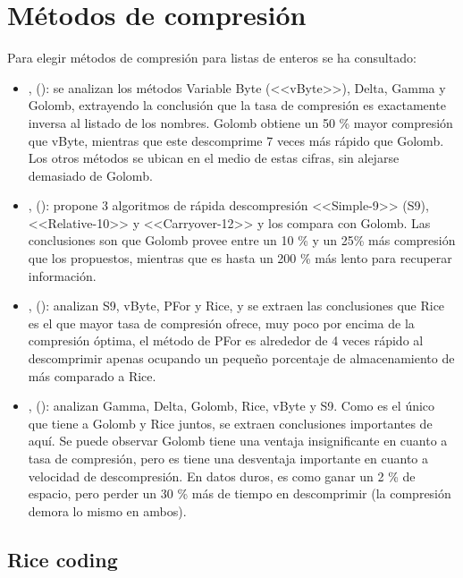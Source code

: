 \section{Métodos de compresión}

Para elegir métodos de compresión para listas de enteros se ha consultado:

\begin{itemize}

\item \citet{Trotman:2003}, (\citeyear{Trotman:2003}): se analizan los métodos Variable Byte (<<vByte>>), Delta, Gamma y Golomb, extrayendo la conclusión que la tasa de compresión es exactamente inversa al listado de los nombres. Golomb obtiene un 50 \% mayor compresión que vByte, mientras que este descomprime 7 veces más rápido que Golomb. Los otros métodos se ubican en el medio de estas cifras, sin alejarse demasiado de Golomb.

\item \citet{Anh:2005}, (\citeyear{Anh:2005}): propone 3 algoritmos de rápida descompresión <<Simple-9>> (S9), <<Relative-10>> y <<Carryover-12>> y los compara con Golomb. Las conclusiones son que Golomb provee entre un 10 \% y un 25\% más compresión que los propuestos, mientras que es hasta un 200 \% más lento para recuperar información.

\item \citet{Zhang:2008}, (\citeyear{Zhang:2008}): analizan S9, vByte, PFor y Rice, y se extraen las conclusiones que Rice es el que mayor tasa de compresión ofrece, muy poco por encima de la compresión óptima, el método de PFor es alrededor de 4 veces rápido al descomprimir apenas ocupando un pequeño porcentaje de almacenamiento de más comparado a Rice.

\item \citet[p.~210]{Buettcher2010}, (\citeyear{Buettcher2010}): analizan Gamma, Delta, Golomb, Rice, vByte y S9. Como es el único que tiene a Golomb y Rice juntos, se extraen conclusiones importantes de aquí. Se puede observar Golomb tiene una ventaja insignificante en cuanto a tasa de compresión, pero es tiene una desventaja importante en cuanto a velocidad de descompresión. En datos duros, es como ganar un 2 \% de espacio, pero perder un 30 \% más de tiempo en descomprimir (la compresión demora lo mismo en ambos).



\end{itemize}

\subsection{Rice coding}

